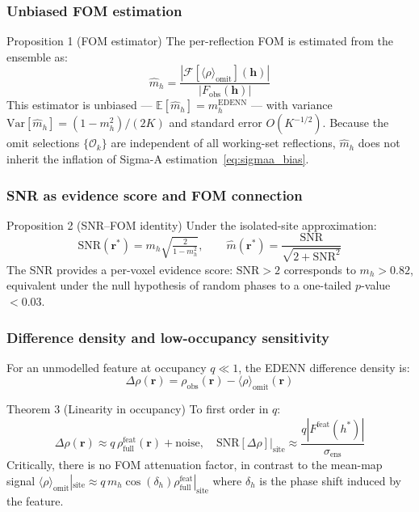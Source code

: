 \documentclass[10pt,twocolumn]{article}
\newcommand{\Fobs}{F_{\!\mathrm{obs}}}
\newcommand{\mh}{m_h}
\newcommand{\rhoens}{\langle\rho\rangle_{\mathrm{omit}}}
\newcommand{\rhodiff}{\Delta\rho}
\newcommand{\FT}{\mathcal{F}}
\newcommand{\Eop}{\mathbb{E}}
\newcommand{\SNR}{\mathrm{SNR}}
\newcommand{\boldh}{\mathbf{h}}
\newcommand{\boldr}{\mathbf{r}}
\begin{document}
\subsubsection{Unbiased FOM estimation}

\begin{mathbox}{Proposition 1 (FOM estimator)}
The per-reflection FOM is estimated from the ensemble as:
\begin{equation}
  \hat m_h = \frac{|\FT[\rhoens](\boldh)|}{|\Fobs(\boldh)|}
  \label{eq:fom_est}
\end{equation}
This estimator is unbiased — $\Eop[\hat m_h] = \mh^{\mathrm{EDENN}}$
— with variance $\mathrm{Var}[\hat m_h] = (1-\mh^2)/(2K)$
and standard error $O(K^{-1/2})$.
Because the omit selections $\{\mathcal{O}_k\}$ are independent of
all working-set reflections, $\hat m_h$ does not inherit the
inflation of Sigma-A estimation~\eqref{eq:sigmaa_bias}.
\end{mathbox}

\subsubsection{SNR as evidence score and FOM connection}

\begin{mathbox}{Proposition 2 (SNR–FOM identity)}
Under the isolated-site approximation:
\begin{equation}
  \SNR(\boldr^*) = \mh\sqrt{\tfrac{2}{1-\mh^2}},
  \qquad
  \hat m(\boldr^*) = \frac{\SNR}{\sqrt{2+\SNR^2}}
  \label{eq:snr_fom}
\end{equation}
The SNR provides a per-voxel evidence score: $\SNR>2$ corresponds
to $\mh>0.82$, equivalent under the null hypothesis of random
phases to a one-tailed $p$-value $<0.03$.
\end{mathbox}

\subsubsection{Difference density and low-occupancy sensitivity}

For an unmodelled feature at occupancy $q \ll 1$, the EDENN
difference density is:
\begin{equation}
  \rhodiff(\boldr)
  = \rho_{\mathrm{obs}}(\boldr) - \rhoens(\boldr)
  \label{eq:diff}
\end{equation}

\begin{mathbox}{Theorem 3 (Linearity in occupancy)}
To first order in $q$:
\begin{equation}
  \rhodiff(\boldr) \approx q\,\rho^{\mathrm{feat}}_{\mathrm{full}}(\boldr)
    + \text{noise},\quad
  \SNR[\rhodiff]\big|_{\mathrm{site}}
  \approx \frac{q|F^{\mathrm{feat}}(h^*)|}{\sigma_{\mathrm{ens}}}
  \label{eq:diff_thm}
\end{equation}
Critically, there is no FOM attenuation factor, in contrast to the
mean-map signal
$\rhoens|_{\mathrm{site}}
\approx q\,\mh\cos(\delta_h)\rho^{\mathrm{feat}}_{\mathrm{full}}|_{\mathrm{site}}$
where $\delta_h$ is the phase shift induced by the feature.
\end{mathbox}
\end{document}
